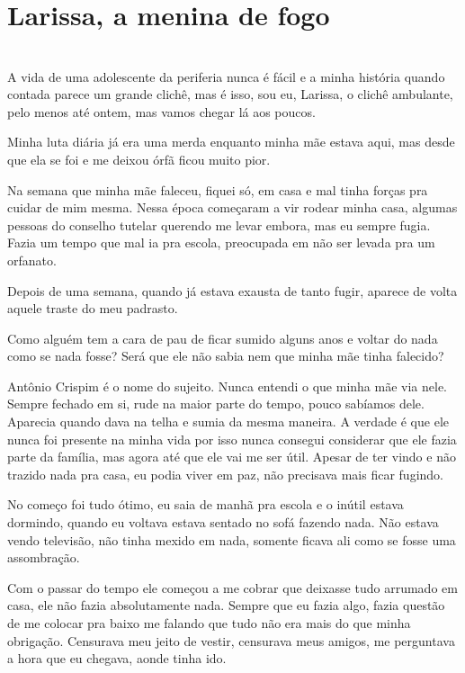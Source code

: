 \newpage


\ifdefined\useChapters
\chapter{Larissa, a menina de fogo}
\else
\chapter{}
\fi
A vida de uma adolescente da periferia nunca é fácil e a minha história quando contada parece um grande clichê, mas é isso, sou eu, Larissa, o clichê ambulante, pelo menos até ontem, mas vamos chegar lá aos poucos.

Minha luta diária já era uma merda enquanto minha mãe estava aqui, mas desde que ela se foi e me deixou órfã ficou muito pior.

Na semana que minha mãe faleceu, fiquei só, em casa e mal tinha forças pra cuidar de mim mesma. Nessa época começaram a vir rodear minha casa, algumas pessoas do conselho tutelar querendo me levar embora, mas eu sempre fugia. Fazia um tempo que mal ia pra escola, preocupada em não ser levada pra um orfanato.

Depois de uma semana, quando já estava exausta de tanto fugir, aparece de volta aquele traste do meu padrasto. 

Como alguém tem a cara de pau de ficar sumido alguns anos e voltar do nada como se nada fosse? Será que ele não sabia nem que minha mãe tinha falecido?

Antônio Crispim é o nome do sujeito. Nunca entendi o que minha mãe via nele. Sempre fechado em si, rude na maior parte do tempo, pouco sabíamos dele. Aparecia quando dava na telha e sumia da mesma maneira. A verdade é que ele nunca foi presente na minha vida por isso nunca consegui considerar que ele fazia parte da família, mas agora até que ele vai me ser útil. Apesar de ter vindo e não trazido nada pra casa, eu podia viver em paz, não precisava mais ficar fugindo.

No começo foi tudo ótimo, eu saia de manhã pra escola e o inútil estava dormindo, quando eu voltava estava sentado no sofá fazendo nada. Não estava vendo televisão, não tinha mexido em nada, somente ficava ali como se fosse uma assombração.

Com o passar do tempo ele começou a me cobrar que deixasse tudo arrumado em casa, ele não fazia absolutamente nada. Sempre que eu fazia algo, fazia questão de me colocar pra baixo me falando que tudo não era mais do que minha obrigação. Censurava meu jeito de vestir, censurava meus amigos, me perguntava a hora que eu chegava, aonde tinha ido.

